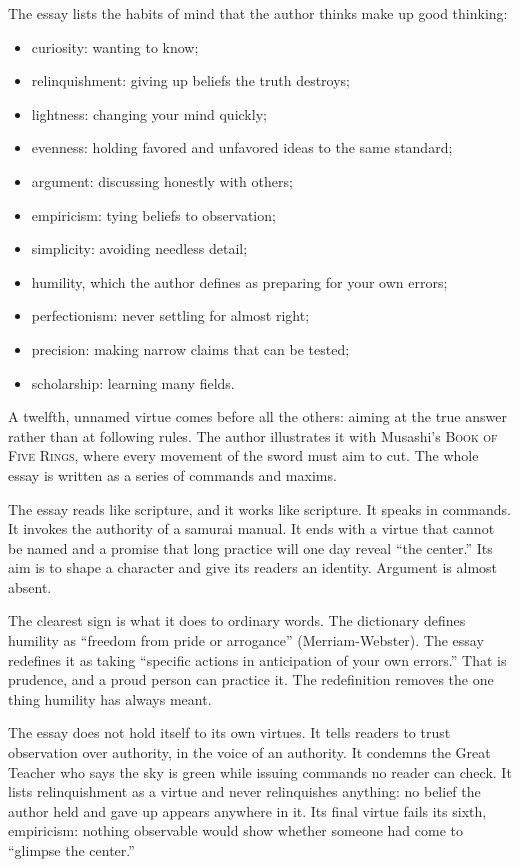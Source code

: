 \begin{afterword}
\summaryhead

The essay lists the habits of mind that the author thinks make up good thinking:
\begin{itemize}
\item curiosity: wanting to know;
\item relinquishment: giving up beliefs the truth destroys;
\item lightness: changing your mind quickly;
\item evenness: holding favored and unfavored ideas to the same standard;
\item argument: discussing honestly with others;
\item empiricism: tying beliefs to observation;
\item simplicity: avoiding needless detail;
\item humility, which the author defines as preparing for your own errors;
\item perfectionism: never settling for almost right;
\item precision: making narrow claims that can be tested;
\item scholarship: learning many fields.
\end{itemize}
A twelfth, unnamed virtue comes before all the others: aiming at the true answer rather than at following rules. The author illustrates it with Musashi's \textsc{Book of Five Rings}, where every movement of the sword must aim to cut. The whole essay is written as a series of commands and maxims.

\responsehead

The essay reads like scripture, and it works like scripture. It speaks in commands. It invokes the authority of a samurai manual. It ends with a virtue that cannot be named and a promise that long practice will one day reveal ``the center.'' Its aim is to shape a character and give its readers an identity. Argument is almost absent.

The clearest sign is what it does to ordinary words. The dictionary defines humility as ``freedom from pride or arrogance'' (Merriam-Webster). The essay redefines it as taking ``specific actions in anticipation of your own errors.'' That is prudence, and a proud person can practice it. The redefinition removes the one thing humility has always meant.

The essay does not hold itself to its own virtues. It tells readers to trust observation over authority, in the voice of an authority. It condemns the Great Teacher who says the sky is green while issuing commands no reader can check. It lists relinquishment as a virtue and never relinquishes anything: no belief the author held and gave up appears anywhere in it. Its final virtue fails its sixth, empiricism: nothing observable would show whether someone had come to ``glimpse the center.''


\end{afterword}
